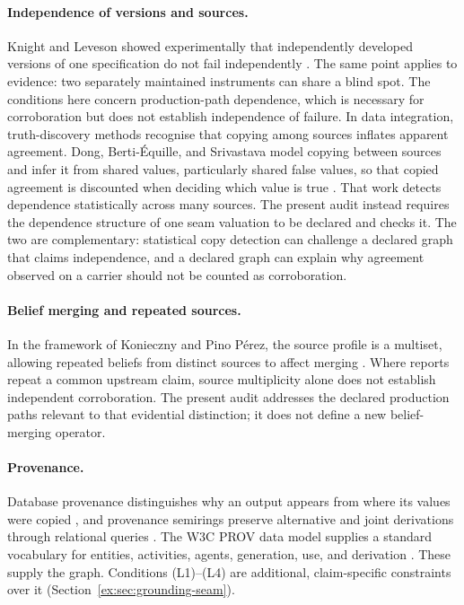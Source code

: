 \documentclass[11pt]{article}
\theoremstyle{definition}
\begin{document}
\paragraph{Independence of versions and sources.} Knight and Leveson showed experimentally that independently developed versions of one specification do not fail independently \citep{knightleveson1986}. The same point applies to evidence: two separately maintained instruments can share a blind spot. The conditions here concern production-path dependence, which is necessary for corroboration but does not establish independence of failure. In data integration, truth-discovery methods recognise that copying among sources inflates apparent agreement. Dong, Berti-\'Equille, and Srivastava model copying between sources and infer it from shared values, particularly shared false values, so that copied agreement is discounted when deciding which value is true \citep{dong2009}. That work detects dependence statistically across many sources. The present audit instead requires the dependence structure of one seam valuation to be declared and checks it. The two are complementary: statistical copy detection can challenge a declared graph that claims independence, and a declared graph can explain why agreement observed on a carrier should not be counted as corroboration.

\paragraph{Belief merging and repeated sources.}
In the framework of Konieczny and Pino P\'erez, the source profile
is a multiset, allowing repeated beliefs from distinct sources to
affect merging \citep{konieczny2002merging}. Where reports repeat
a common upstream claim, source multiplicity alone does not establish
independent corroboration. The present audit addresses the declared
production paths relevant to that evidential distinction; it does
not define a new belief-merging operator.

\paragraph{Provenance.} Database provenance distinguishes why an output appears from where its values were copied \citep{buneman2001}, and provenance semirings preserve alternative and joint derivations through relational queries \citep{greenkarvounarakistannen2007}. The W3C PROV data model supplies a standard vocabulary for entities, activities, agents, generation, use, and derivation \citep{w3cprovdm2013}. These supply the graph. Conditions (L1)--(L4) are additional, claim-specific constraints over it (Section~\ref{ex:sec:grounding-seam}).
\end{document}
